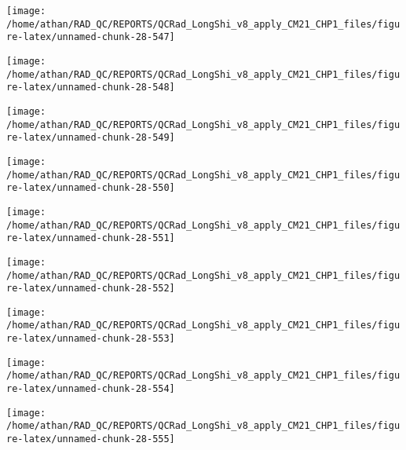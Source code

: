 \documentclass[
  10pt,
  a4paper,oneside]{article}
\begin{document}
\begin{center}\texttt{[image: /home/athan/RAD\_QC/REPORTS/QCRad\_LongShi\_v8\_apply\_CM21\_CHP1\_files/figure-latex/unnamed-chunk-28-547]} \end{center}

\begin{center}\texttt{[image: /home/athan/RAD\_QC/REPORTS/QCRad\_LongShi\_v8\_apply\_CM21\_CHP1\_files/figure-latex/unnamed-chunk-28-548]} \end{center}

\begin{center}\texttt{[image: /home/athan/RAD\_QC/REPORTS/QCRad\_LongShi\_v8\_apply\_CM21\_CHP1\_files/figure-latex/unnamed-chunk-28-549]} \end{center}

\begin{center}\texttt{[image: /home/athan/RAD\_QC/REPORTS/QCRad\_LongShi\_v8\_apply\_CM21\_CHP1\_files/figure-latex/unnamed-chunk-28-550]} \end{center}

\begin{center}\texttt{[image: /home/athan/RAD\_QC/REPORTS/QCRad\_LongShi\_v8\_apply\_CM21\_CHP1\_files/figure-latex/unnamed-chunk-28-551]} \end{center}

\begin{center}\texttt{[image: /home/athan/RAD\_QC/REPORTS/QCRad\_LongShi\_v8\_apply\_CM21\_CHP1\_files/figure-latex/unnamed-chunk-28-552]} \end{center}

\begin{center}\texttt{[image: /home/athan/RAD\_QC/REPORTS/QCRad\_LongShi\_v8\_apply\_CM21\_CHP1\_files/figure-latex/unnamed-chunk-28-553]} \end{center}

\begin{center}\texttt{[image: /home/athan/RAD\_QC/REPORTS/QCRad\_LongShi\_v8\_apply\_CM21\_CHP1\_files/figure-latex/unnamed-chunk-28-554]} \end{center}

\begin{center}\texttt{[image: /home/athan/RAD\_QC/REPORTS/QCRad\_LongShi\_v8\_apply\_CM21\_CHP1\_files/figure-latex/unnamed-chunk-28-555]} \end{center}
\end{document}
